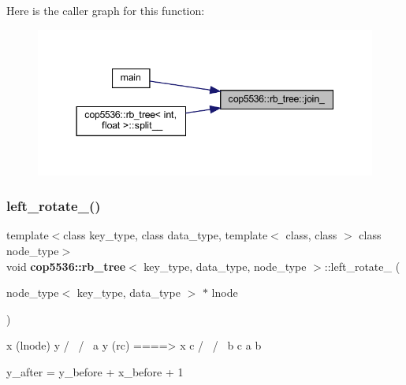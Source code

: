Here is the caller graph for this function\+:
\nopagebreak
\begin{figure}[H]
\begin{center}
\leavevmode
\includegraphics[width=344pt]{classcop5536_1_1rb__tree_ac1820993f2e295c42de97af664503885_icgraph}
\end{center}
\end{figure}
\mbox{\label{classcop5536_1_1rb__tree_a30f8fadbea424e23c6831cc77f921232}} 
\subsubsection{left\_rotate\_()}
{\footnotesize\ttfamily template$<$class key\+\_\+type, class data\+\_\+type, template$<$ class, class $>$ class node\+\_\+type$>$ \\
void \textbf{ cop5536\+::rb\+\_\+tree}$<$ key\+\_\+type, data\+\_\+type, node\+\_\+type $>$\+::left\+\_\+rotate\+\_\+ (\begin{DoxyParamCaption}\item[{node\+\_\+type$<$ key\+\_\+type, data\+\_\+type $>$ $\ast$}]{lnode }\end{DoxyParamCaption})\hspace{0.3cm}{\ttfamily [inline]}}

\begin{DoxyVerb}      x (lnode)                 y
     / \                       / \
    a   y (rc)  ====>         x   c
       / \                   / \
      b   c                 a   b
\end{DoxyVerb}
 y\+\_\+after = y\+\_\+before + x\+\_\+before + 1 \mbox{\label{classcop5536_1_1rb__tree_acf8c4a7d8a0274ae9b8beed6ce4b0f3c}} 
